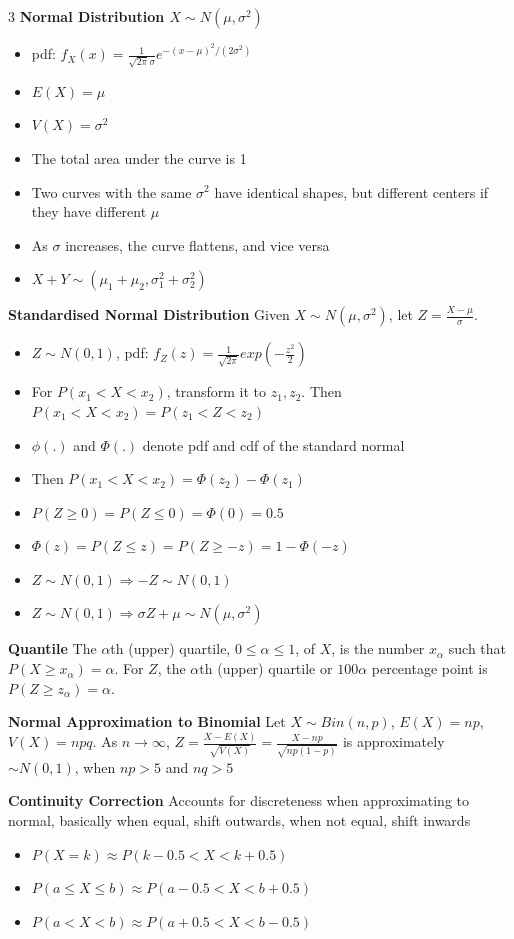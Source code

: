 \documentclass[10pt, landscape]{article}
\begin{document}
\begin{multicols*}{3}
\textbf{Normal Distribution $X\sim N(\mu, \sigma^2)$}
\begin{itemize}
    \item pdf: $f_X(x)=\frac{1}{\sqrt{2\pi}\sigma}e^{-(x-\mu)^2/(2\sigma^2)}$
    \item $E(X)=\mu$
    \item $V(X)=\sigma^2$
    \item The total area under the curve is 1
    \item Two curves with the same $\sigma^2$ have identical shapes, but different centers if they have different $\mu$
    \item As $\sigma$ increases, the curve flattens, and vice versa
    \item $X+Y \sim (\mu_1+\mu_2, \sigma_1^2 + \sigma^2_2)$
\end{itemize}

\textbf{Standardised Normal Distribution} Given $X\sim N(\mu, \sigma^2)$, let $Z=\frac{X-\mu}{\sigma}$.
\begin{itemize}
    \item  $Z \sim N(0, 1)$, pdf: $f_Z(z)=\frac{1}{\sqrt{2\pi}}exp(-\frac{z^2}{2})$
    \item For $P(x_1<X<x_2)$, transform it to $z_1, z_2$. Then $P(x_1<X<x_2)=P(z_1<Z<z_2)$
    \item $\phi(.)$ and $\Phi(.)$ denote pdf and cdf of the standard normal
    \item Then $P(x_1<X<x_2)=\Phi(z_2)-\Phi(z_1)$
    \item $P(Z \geq 0) = P(Z\leq 0)=\Phi(0)=0.5$
    \item $\Phi(z)=P(Z \leq z)=P(Z \geq -z)=1-\Phi(-z)$
    \item $Z\sim N(0, 1) \Rightarrow -Z \sim N(0, 1)$
    \item $Z \sim N(0, 1) \Rightarrow \sigma Z + \mu \sim N(\mu, \sigma^2)$
\end{itemize}

\textbf{Quantile} The $\alpha$th (upper) quartile, $0 \leq \alpha \leq 1$, of $X$, is the number $x_\alpha$ such that $P(X \geq x_\alpha)=\alpha$. For $Z$, the $\alpha$th (upper) quartile or $100\alpha$ percentage point is $P(Z \geq z_\alpha)=\alpha$.

\textbf{Normal Approximation to Binomial} Let $X\sim Bin(n, p)$, $E(X)=np$, $V(X)=npq$. As $n \rightarrow\infty$, $Z=\frac{X-E(X)}{\sqrt{V(X)}}=\frac{X-np}{\sqrt{np(1-p)}}$ is approximately $\sim N(0, 1)$, when $np>5$ and $nq>5$

\textbf{Continuity Correction} Accounts for discreteness when approximating to normal, basically when equal, shift outwards, when not equal, shift inwards
\begin{itemize}
    \item $P(X=k)\approx P(k-0.5<X<k+0.5)$
    \item $P(a\leq X \leq b)\approx P(a-0.5<X<b+0.5)$
    \item $P(a < X < b)\approx P(a+0.5<X<b-0.5)$
\end{itemize}


\end{multicols*}
\end{document}
